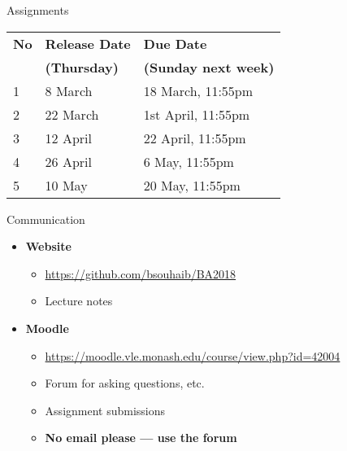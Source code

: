 \documentclass[14pt]{beamer}
\begin{document}
\begin{frame}{Assignments}



\begin{block}{}{\tabcolsep=0.1cm\begin{tabular}{lll}
  \textbf{No}    & \textbf{Release Date}     & \textbf{Due Date} \\ 
      & \textbf{(Thursday)}     & \textbf{(Sunday next week)} \\ 
      \midrule
    1 &  8 March &  18 March, 11:55pm \\
    2 &	 22 March &  1st April, 11:55pm \\
    3 &	 12 April &  22 April, 11:55pm \\
    4 &	 26 April &  6 May, 11:55pm \\
    5 &	 10 May &  20 May, 11:55pm
\end{tabular}}
\end{block}

\end{frame}


\begin{frame}{Communication}


\begin{itemize}
	\item \textbf{Website}
	\begin{itemize}
	\item  \url{https://github.com/bsouhaib/BA2018}
	\item Lecture notes
	\end{itemize}
	
	\item \textbf{Moodle} 
	\begin{itemize}
	\item \url{https://moodle.vle.monash.edu/course/view.php?id=42004}
	\item Forum for asking questions, etc.
	\item Assignment submissions
	\item \textbf{No email please --- use the forum}
	\end{itemize}
	
\end{itemize}


\end{frame}
\end{document}
